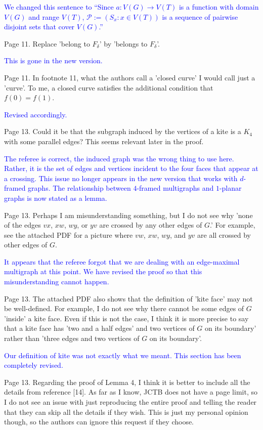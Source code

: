 \documentclass[12pt]{article}
\newcommand{\changed}{\textcolor{blue}{Revised accordingly.}}
\begin{document}
\textcolor{blue}{We changed this sentence to ``Since $a:V(G)\to V(T)$ is a function with domain $V(G)$ and range $V(T)$, $\mathcal{P}:=(S_x : x\in V(T))$ is a sequence of pairwise disjoint sets that cover $V(G)$.''}

Page 11. Replace 'belong to $F_\delta$' by 'belongs to $F_\delta$'.

\textcolor{blue}{This is gone in the new version.}

Page 11. In footnote 11, what the authors call a 'closed curve' I
would call just a 'curve'.  To me, a closed curve satisfies the
additional condition that $f(0)=f(1)$.

\changed

Page 13. Could it be that the subgraph induced by the vertices of a
kite is a $K_4$ with some parallel edges?  This seems relevant later in
the proof.

\textcolor{blue}{The referee is correct, the induced graph was the wrong thing to use here.  Rather, it is the set of edges and vertices incident to the four faces that appear at a crossing.  This issue no longer appears in the new version that works with $d$-framed graphs.  The relationship between $4$-framed multigraphs and $1$-planar graphs is now stated as a lemma.}

Page 13. Perhaps I am misunderstanding something, but I do not see why
'none of the edges $vx$, $xw$, $wy$, or $yv$ are crossed by any other edges of
$G$.'  For example, see the attached PDF for a picture where $vw$, $xw$, $wy$,
and $yv$ are all crossed by other edges of $G$.

\textcolor{blue}{It appears that the referee forgot that we are dealing with an edge-maximal multigraph at this point. We have revised the proof so that this misunderstanding cannot happen.}


Page 13. The attached PDF also shows that the definition of 'kite
face' may not be well-defined.  For example, I do not see why there
cannot be some edges of $G$ 'inside' a kite face.  Even if this is not
the case, I think it is more precise to say that a kite face has 'two
and a half edges' and two vertices of $G$ on its boundary' rather than
'three edges and two vertices of $G$ on its boundary'.

\textcolor{blue}{Our definition of kite was not exactly what we meant. This section has been completely revised.}

Page 13.  Regarding the proof of Lemma 4, I think it is better to
include all the details from reference [14].  As far as I know, JCTB
does not have a page limit, so I do not see an issue with just
reproducing the entire proof and telling the reader that they can skip
all the details if they wish.  This is just my personal opinion
though, so the authors can ignore this request if they choose.
\end{document}
